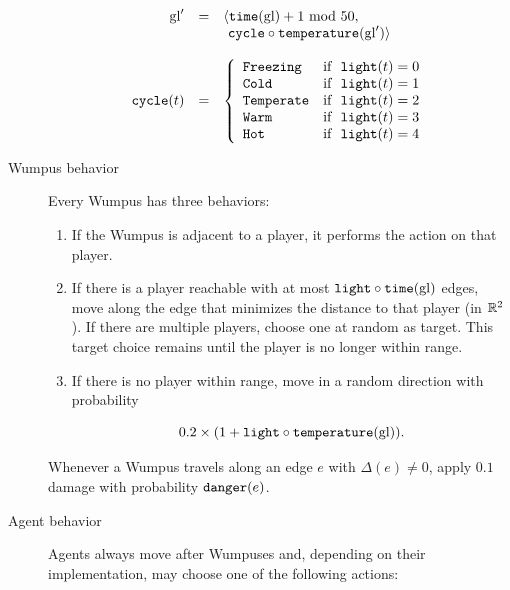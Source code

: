 \begin{definition}
\begin{description}
	$$
		\begin{array}{r c l}
			\mathrm{gl}' & = & \langle \mathtt{time}(\mathrm{gl}) + 1\ \mathrm{mod}\ 50,\\
					   &   &       \ \mathtt{cycle} \circ \mathtt{temperature}(\mathrm{gl}') \rangle\\
			\\
			\mathtt{cycle}(t) & = &
			\left\{
				\begin{array}{l l}
					\mathtt{Freezing} & \textnormal{if }\ \mathtt{light}(t) = 0\\
					\mathtt{Cold} & \textnormal{if }\ \mathtt{light}(t) = 1\\
					\mathtt{Temperate} & \textnormal{if }\ \mathtt{light}(t) = 2\\
					\mathtt{Warm} & \textnormal{if }\ \mathtt{light}(t) = 3\\
					\mathtt{Hot} & \textnormal{if }\ \mathtt{light}(t) = 4
				\end{array}
			\right.\\
		\end{array}
	$$
	
	\item[Wumpus behavior] Every Wumpus has three behaviors:
	
	\begin{enumerate}
		\item If the Wumpus is adjacent to a player, it performs the  action on that player.
		
		\item If there is a player reachable with at most $\mathtt{light} \circ \mathtt{time} (\mathrm{gl})$ edges, move along the edge that minimizes the distance to that player (in $\mathbb{R}^2$). If there are multiple players, choose one at random as target. This target choice remains until the player is no longer within range.
		
		\item If there is no player within range, move in a random direction with probability
		
		$$
			0.2 \times (1 + \mathtt{light} \circ \mathtt{temperature} (\mathrm{gl})).
		$$
	\end{enumerate}
	
	Whenever a Wumpus travels along an edge $e$ with $\Delta(e) \neq 0$, apply $0.1$ damage with probability $\mathtt{danger}(e)$.
	
	\item[Agent behavior] Agents always move after Wumpuses and, depending on their implementation, may choose one of the following actions:
	

\end{description}
\end{definition}
